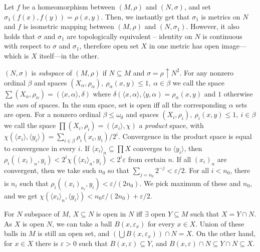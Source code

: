 Let $f$ be a homeomorphism between $(M,\rho)$ and $(N,\sigma)$, and set 
$\sigma_1(f(x),f(y)) = \rho(x,y)$. Then, we instantly get that $\sigma_1$ 
is metrics on $N$ and $f$ is isometric mapping between $(M,\rho)$ and 
$(N,\sigma_1)$. However, it also holds that $\sigma$ and $\sigma_1$ are 
topologically equivalent -- identity on $N$ is continuous with respect to 
$\sigma$ and $\sigma_1$, therefore open set $X$ in one metric has open 
image---which is $X$ itself---in the other.

\medskip

 $(N,\sigma)$ is {\it subspace} of $(M,\rho)$ if 
$N\subseteq M$ and $\sigma = \rho\uparrow N^2$. 
\smallskip
{}
For any nonzero ordinal $\beta$ and spaces $(X_\alpha,\rho_\alpha),\ 
\rho_\alpha(x,y)\leq 1,\ \alpha \in \beta$ we call the 
space $\sum (X_\alpha,\rho_\alpha) = (\langle x,\alpha\rangle, \delta)$ where 
$\delta(\langle x,\alpha\rangle,\langle y,\alpha) = \rho_\alpha(x,y)$ and 
$1$ otherwise the {\it sum} of spaces. In the sum space, set is open iff 
all the corresponding $\alpha$ sets are open.
\smallskip
{} For a nonzero ordinal $\beta \leq \omega_0$ and spaces 
$(X_i,\rho_i),\ \rho_i(x,y)\leq 1,\ i \in \beta$ 
we call the space $\prod (X_i,\rho_i) = (\langle x_i
\rangle, \chi)$ a {\it product} space, with $\chi(\langle x_i\rangle, 
\langle y_i \rangle) = \sum_{i\in \beta} \rho_i(x_i,y_i) / 2^i$.
Convergence in the product space is equal to convergence in every $i$.
If $\langle x_i\rangle_n \subseteq\prod X$ converges to $\langle y_i
\rangle$, then $\rho_i(
(x_i)_n, y_i) < 2^i \chi(\langle x_i\rangle_n, y_i) < 2^i \varepsilon$ from 
certain $n$. If all $(x_i)_n$ are convergent, then we take such $n_0$ so 
that $\sum_{j=n_0} 2^{-j} < \varepsilon/2$. For all $i < n_0$, there is 
$n_i$ such that $\rho_i((x_i)_{n_i},y_i) < \varepsilon/(2n_0)$. We pick maximum 
of these and $n_0$, and we get $\chi(\langle x_i\rangle_n, \langle y_i\rangle)
< n_0\varepsilon/(2n_0) + \varepsilon/2$.

\medskip
For $N$ subspace of $M$, $X\subseteq N$ is open in $N$ iff $\exists$ open 
$Y\subseteq M$ such that $X = Y\cap N$. As $X$ is open $N$, we can take 
a ball $B(x,\varepsilon_x)$ for every $x\in X$. Union of these balls in 
$M$ is still an open set, and $(\bigcup B(x,\varepsilon_x)) \cap N = X$.
On the other hand, for $x\in X$ there is $\varepsilon >0$ such that 
$B(x,\varepsilon)\subseteq Y$, and $B(x,\varepsilon)\cap N \subseteq 
Y\cap N \subseteq X$.

